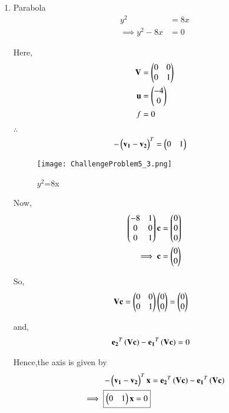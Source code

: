 \documentclass[journal,12pt,twocolumn]{IEEEtran}
\begin{document}
\begin{enumerate}
    \item Parabola
    \begin{align}
        y^2 &= 8x
        \\
        \implies y^2-8x &= 0
    \end{align}
    
    Here,
    \begin{align}
    \mathbf{V} &= \begin{pmatrix}0 & 0 \\ 0 & 1\end{pmatrix} \\
    \mathbf{u} &= \begin{pmatrix}-4 \\ 0\end{pmatrix} \\
    f &= 0
    \end{align}

    $\therefore$
    \begin{align}
    -\begin{pmatrix}\mathbf{v_1}-\mathbf{v_2}\end{pmatrix}^T &= \begin{pmatrix}0 & 1\end{pmatrix}
    \end{align}
    
    \begin{figure}[!ht]
    \centering
    \texttt{[image: ChallengeProblem5\_3.png]}
    \caption{$y^2$=8x}
    \label{ex3}	
    \end{figure}

    Now,
    \begin{align}
    \begin{pmatrix}-8 & 1 \\ 0 & 0 \\ 0 & 1\end{pmatrix}\mathbf{c} &= \begin{pmatrix}0 \\ 0 \\ 0\end{pmatrix}
    \\
    \implies \mathbf{c} &= \begin{pmatrix}0 \\ 0\end{pmatrix}
    \end{align}

    So,
    \begin{align}
    \mathbf{V}\mathbf{c} &= \begin{pmatrix}0 & 0 \\ 0 & 1\end{pmatrix}\begin{pmatrix}0 \\ 0\end{pmatrix}=\begin{pmatrix}0 \\ 0\end{pmatrix}
    \end{align}

    and,
    \begin{align}
    \mathbf{e_2}^T\left(\mathbf{V}\mathbf{c}\right) - \mathbf{e_1}^T\left(\mathbf{V}\mathbf{c}\right) &= 0
    \end{align}

    Hence,the axis is given by
    \begin{align}
    -\begin{pmatrix}\mathbf{v_1}-\mathbf{v_2}\end{pmatrix}^T\mathbf{x} &=\mathbf{e_2}^T\left(\mathbf{V}\mathbf{c}\right) - \mathbf{e_1}^T\left(\mathbf{V}\mathbf{c}\right) \\
    \implies \boxed{\begin{pmatrix}0 & 1\end{pmatrix}\mathbf{x} = 0}
    \end{align}
    

\end{enumerate}
\end{document}
